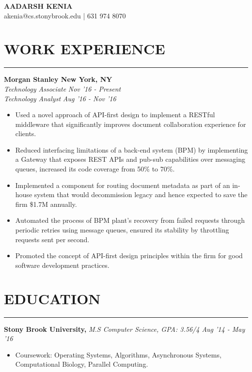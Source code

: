\documentclass[12pt]{article}
\newcommand{\sectionHeading}[1]{
\section*{\small{#1}}
\vspace{-8pt}
\hrule
\vspace{8pt}
}
\newcommand{\experienceSectionSubheadingAlternate}[6]{
  \vspace{-1pt}
    \small{\textbf{Morgan Stanley \hfill New York, NY}} \\
    \small{\textit{#3} \hfill \textit{#4}} \\
    \small{\textit{#5} \hfill \textit{#6}} \\
    \vspace{-15pt}
}
\newcommand{\educationSectionSubheading}[3]{
    \noindent \small{\textbf{#1, }\textit{#2 \hfill #3}} \vspace{-20pt}\\
}
\newcommand{\sectionListStart}{
    \begin{itemize}[label={\small{\textbullet}}, leftmargin=20pt] %
}
\newcommand{\sectionListEnd}{\end{itemize}}
\newcommand{\sectionListItem}[1]{\item \small{#1}}
\begin{document}
\begin{center}
\LARGE{\textbf{AADARSH KENIA}}\\
\vspace{4pt}
\small{\Letter \hspace{2mm}akenia@cs.stonybrook.edu} | \Telefon \hspace{2mm}631 974 8070
\end{center}

\sectionHeading{WORK EXPERIENCE}
\experienceSectionSubheadingAlternate
{Morgan Stanley}{New York, NY}
{Technology Associate}{Nov '16 - Present}
{Technology Analyst}{Aug '16 - Nov '16}
\sectionListStart
    \sectionListItem
        Used a novel approach of API-first design to implement a RESTful middleware that significantly improves document collaboration experience for clients.

    \sectionListItem
        Reduced interfacing limitations of a back-end system (BPM) by implementing a Gateway that exposes REST APIs and pub-sub capabilities over messaging queues, increased its code coverage from 50\% to 70\%.

    \sectionListItem
        Implemented a component for routing document metadata as part of an in-house system that would decommission legacy and hence expected to save the firm \$1.7M annually.
        
    \sectionListItem
        Automated the process of BPM plant's recovery from failed requests through periodic retries using message queues, ensured its stability by throttling requests sent per second. 
        
    \sectionListItem
        Promoted the concept of API-first design principles within the firm for good software development practices.
        
\sectionListEnd


\sectionHeading{EDUCATION}
\educationSectionSubheading
{Stony Brook  University}{M.S Computer Science, GPA: 3.56/4}{Aug '14 - May '16}
\sectionListStart
    \sectionListItem
        Coursework: Operating Systems, Algorithms, Asynchronous Systems, Computational Biology, Parallel Computing. 
\sectionListEnd
\end{document}
